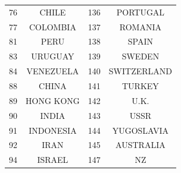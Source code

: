 \documentclass{scrartcl}
\begin{document}
\begin{table}[h!]
\begin{center}
\begin{tabular}{|l|c|l|c|}
76& CHILE       &       136 &PORTUGAL    \\
77& COLOMBIA    &       137 &ROMANIA    \\
81& PERU        &       138 &SPAIN       \\
83& URUGUAY     &       139 &SWEDEN      \\
84& VENEZUELA   &       140 &SWITZERLAND     \\
88& CHINA       &       141 &TURKEY      \\
89& HONG KONG   &       142 &U.K.        \\
90& INDIA       &       143 &USSR        \\
91& INDONESIA   &       144 &YUGOSLAVIA  \\
92& IRAN        &       145 &AUSTRALIA   \\
94& ISRAEL      &       147 &NZ      \\
\hline
\end{tabular}
\end{center}
\end{table}



\end{document}
